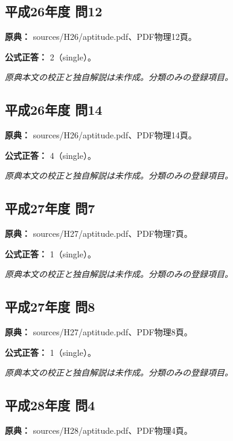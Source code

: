 \subsection{平成26年度 問12}
\label{q:h26-reg-apt-12}

\noindent\textbf{原典：} sources/H26/aptitude.pdf、PDF物理12頁。

\textbf{公式正答：} 2（single）。

\par\textit{原典本文の校正と独自解説は未作成。分類のみの登録項目。}

\subsection{平成26年度 問14}
\label{q:h26-reg-apt-14}

\noindent\textbf{原典：} sources/H26/aptitude.pdf、PDF物理14頁。

\textbf{公式正答：} 4（single）。

\par\textit{原典本文の校正と独自解説は未作成。分類のみの登録項目。}

\subsection{平成27年度 問7}
\label{q:h27-reg-apt-07}

\noindent\textbf{原典：} sources/H27/aptitude.pdf、PDF物理7頁。

\textbf{公式正答：} 1（single）。

\par\textit{原典本文の校正と独自解説は未作成。分類のみの登録項目。}

\subsection{平成27年度 問8}
\label{q:h27-reg-apt-08}

\noindent\textbf{原典：} sources/H27/aptitude.pdf、PDF物理8頁。

\textbf{公式正答：} 1（single）。

\par\textit{原典本文の校正と独自解説は未作成。分類のみの登録項目。}

\subsection{平成28年度 問4}
\label{q:h28-reg-apt-04}

\noindent\textbf{原典：} sources/H28/aptitude.pdf、PDF物理4頁。

